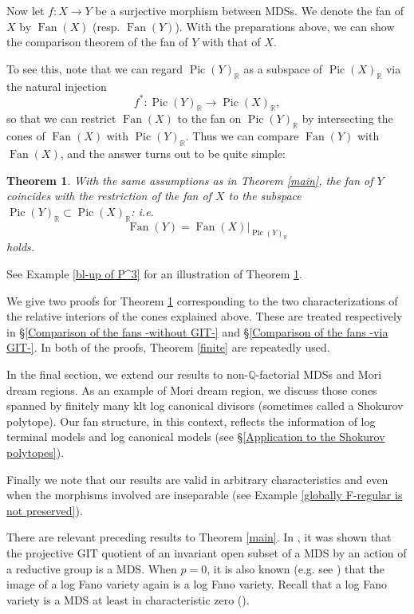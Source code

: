 \documentclass[12pt,twoside]{amsart}
\newtheorem{theo}{Theorem}[section]
\theoremstyle{definition}
\newcommand\Pic{\mathop{\mathrm{Pic}}\nolimits}
\newcommand\Fan{\mathop{\mathrm{Fan}}}
\newcommand\bq{\mathbb{Q}}
\newcommand\br{\mathbb{R}}
\begin{document}
Now let $f:X\to Y$ be a surjective morphism between MDSs. We denote the fan of $X$ by
$\Fan{(X)}$ (resp. $\Fan{(Y)}$).
With the preparations above, we can show the comparison theorem of the fan of $Y$ with that of $X$.

To see this, note that we can
regard $\Pic{(Y)}_{\br}$ as a subspace of $\Pic{(X)}_{\br}$ via the natural injection
\begin{equation*}
f^{*}:\Pic{(Y)}_{\br}\to\Pic{(X)}_{\br},
\end{equation*}
so that we can restrict $\Fan{(X)}$ to the fan on $\Pic{(Y)}_{\br}$ by intersecting the cones of $\Fan{(X)}$
with $\Pic{(Y)}_{\br}$. Thus we can compare $\Fan{(Y)}$ with $\Fan{(X)}$,
and the answer turns out to be quite simple:

\begin{theo}\label{fans}
With the same assumptions as in Theorem \ref{main},
the fan of $Y$ coincides with the restriction of the fan of $X$ to the subspace $\Pic{(Y)}_{\br}\subset\Pic{(X)}_{\br}$: i.e.
\begin{equation*}
\Fan{(Y)}=\Fan{(X)}|_{\Pic{(Y)}_{\br}}
\end{equation*}
holds.
\end{theo}

See Example \ref{bl-up of P^3} for an illustration of Theorem \ref{fans}.

We give two proofs for Theorem \ref{fans} corresponding to the two characterizations of the
relative interiors of the cones explained above. These are treated respectively in
\S\ref{Comparison of the fans -without GIT-} and
\S\ref{Comparison of the fans -via GIT-}. In both of the proofs, Theorem \ref{finite} are repeatedly used.

In the final section, we extend our results to non-$\bq$-factorial MDSs and Mori dream regions.
As an example of Mori dream region, we discuss those cones spanned by finitely many
klt log canonical divisors (sometimes called a Shokurov polytope).
Our fan structure, in this context, reflects the information of log terminal models and log canonical models
(see \S\ref{Application to the Shokurov polytopes}).

Finally we note that our results are valid in arbitrary characteristics and even when the morphisms involved
are inseparable (see Example \ref{globally F-regular is not preserved}).



There are relevant preceding results to Theorem \ref{main}.
In \cite{b}, it was shown that
the projective GIT quotient of an invariant open subset of a MDS
by an action of a reductive group is a MDS.
When $p=0$, it is also known (e.g. see \cite[Corollary 5.2]{fg}) that the image of a log Fano variety 
again is a log Fano variety. Recall that a log Fano variety is a MDS at least in characteristic zero
(\cite[Corollary 1.3.2]{bchm}).
\end{document}
